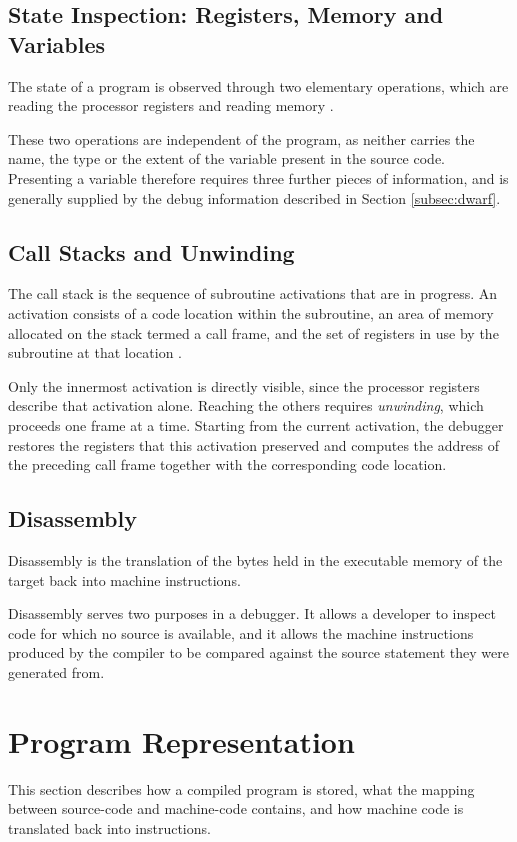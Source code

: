 \subsection{State Inspection: Registers, Memory and Variables}
The state of a program is observed through two elementary operations, which are reading the processor registers and reading memory \cite{markusson2008}.

These two operations are independent of the program, as neither carries the name, the type or the extent of the variable present in the source code. Presenting a variable therefore requires three further pieces of information, and is generally supplied by the debug information described in Section \ref{subsec:dwarf}.

\subsection{Call Stacks and Unwinding}
 The call stack is the sequence of subroutine activations that are in progress. An activation consists of a code location within the subroutine, an area of memory allocated on the stack termed a call frame, and the set of registers in use by the subroutine at that location \cite{dwarf5}.

Only the innermost activation is directly visible, since the processor registers describe that activation alone. Reaching the others requires \textit{unwinding}, which proceeds one frame at a time. Starting from the current activation, the debugger restores the registers that this activation preserved and computes the address of the preceding call frame together with the corresponding code location\cite{dwarf5}.

\subsection{Disassembly}
Disassembly is the translation of the bytes held in the executable memory of the target back into machine instructions.

Disassembly serves two purposes in a debugger. It allows a developer to inspect code for which no source is available, and it allows the machine instructions produced by the compiler to be compared against the source statement they were generated from.

\section{Program Representation}
\label{sec:program_repr}
This section describes how a compiled program is stored, what the mapping between source-code and machine-code contains, and how machine code is translated back into instructions.

